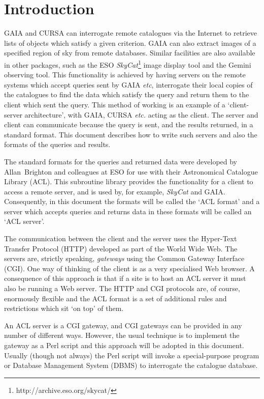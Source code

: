 \documentclass[twoside,11pt]{article}
\newcommand{\htmladdnormallinkfoot}[2]{#1\footnote{#2}}
\newcommand{\xref}[3]{#1}
\newcommand{\xlabel}[1]{}
\renewcommand{\_}{\texttt{\symbol{95}}}
\begin{document}
\section{\xlabel{INTRO}\label{INTRO}Introduction}

\xref{GAIA}{sun214}{}\cite{SUN214} and \xref{CURSA}{sun190}{}\cite{SUN190}
can interrogate remote catalogues via the Internet to retrieve lists of
objects which satisfy a given criterion.  GAIA can also extract images
of a specified region of sky from remote databases.  Similar facilities
are also available in other packages, such as the ESO
\htmladdnormallinkfoot{{\it SkyCat}\/}{http://archive.eso.org/skycat/}
image display tool and the Gemini observing tool.  This functionality
is achieved by having servers on the remote systems which accept queries
sent by GAIA \emph{etc}, interrogate their local copies of the catalogues
to find the data which satisfy the query and return them to the client
which sent the query.  This method of working is an example of a
`client-server architecture', with GAIA, CURSA \emph{etc.} acting as the
client.  The server and client can communicate because the query is sent,
and the results returned, in a standard format.  This document describes
how to write such servers and also the formats of the queries and results.

The standard formats for the queries and returned data were developed by
Allan~Brighton and colleagues at ESO for use with their Astronomical
Catalogue Library (ACL).  This subroutine library provides the
functionality for a client to access a remote server, and is used by,
for example, {\it SkyCat}\/ and GAIA.  Consequently, in this document
the formats will be called the `ACL format' and a server which accepts
queries and returns data in these formats will be called an `ACL server'.

The communication between the client and the server uses the Hyper-Text
Transfer Protocol (HTTP)  developed as part of the World Wide Web.  The
servers are, strictly speaking, {\it gateways}\/ using the Common Gateway
Interface (CGI).  One way of thinking of the client is as a very
specialised Web browser.  A consequence of this approach is that if a
site is to host an ACL server it must also be running a Web server.  The
HTTP and CGI protocols are, of course, enormously flexible and the
ACL format is a set of additional rules and restrictions which sit `on
top' of them.

An ACL server is a CGI gateway, and CGI gateways can be provided in any
number of different ways.  However, the usual technique is to implement
the gateway as a Perl script and this approach will be adopted in this
document.  Usually (though not always) the Perl script will invoke a
special-purpose program or Database Management System (DBMS) to
interrogate the catalogue database.
\end{document}
